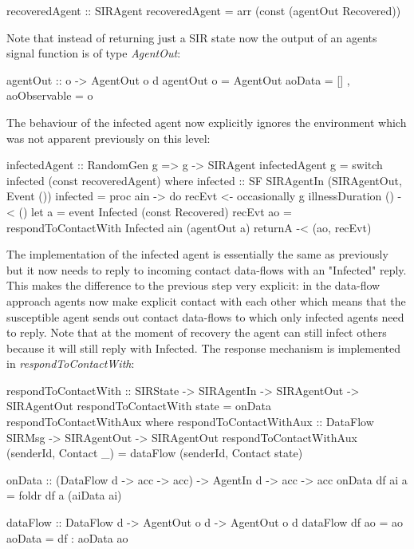 \begin{HaskellCode}
recoveredAgent :: SIRAgent
recoveredAgent = arr (const (agentOut Recovered))
\end{HaskellCode}

Note that instead of returning just a SIR state now the output of an agents signal function is of type \textit{AgentOut}:

\begin{HaskellCode}
agentOut :: o -> AgentOut o d
agentOut o = AgentOut {
    aoData       = []
  , aoObservable = o }
\end{HaskellCode}

The behaviour of the infected agent now explicitly ignores the environment which was not apparent previously on this level:

\begin{HaskellCode}
infectedAgent :: RandomGen g => g -> SIRAgent
infectedAgent g = switch infected (const recoveredAgent)
  where
    infected :: SF SIRAgentIn (SIRAgentOut, Event ())
    infected = proc ain -> do
      recEvt <- occasionally g illnessDuration () -< ()
      let a  = event Infected (const Recovered) recEvt
          ao = respondToContactWith Infected ain (agentOut a)
      returnA -< (ao, recEvt)
\end{HaskellCode}

The implementation of the infected agent is essentially the same as previously but it now needs to reply to incoming contact data-flows with an "Infected" reply. This makes the difference to the previous step very explicit: in the data-flow approach agents now make explicit contact with each other which means that the susceptible agent sends out contact data-flows to which only infected agents need to reply. Note that at the moment of recovery the agent can still infect others because it will still reply with Infected. The response mechanism is implemented in \textit{respondToContactWith}:

\begin{HaskellCode}
respondToContactWith :: SIRState -> SIRAgentIn -> SIRAgentOut -> SIRAgentOut
respondToContactWith state = onData respondToContactWithAux
  where
    respondToContactWithAux :: DataFlow SIRMsg -> SIRAgentOut -> SIRAgentOut
    respondToContactWithAux (senderId, Contact _) = dataFlow (senderId, Contact state)
    
onData :: (DataFlow d -> acc -> acc) -> AgentIn d -> acc -> acc
onData df ai a = foldr df a (aiData ai)

dataFlow :: DataFlow d -> AgentOut o d -> AgentOut o d
dataFlow df ao = ao { aoData = df : aoData ao }
\end{HaskellCode}

